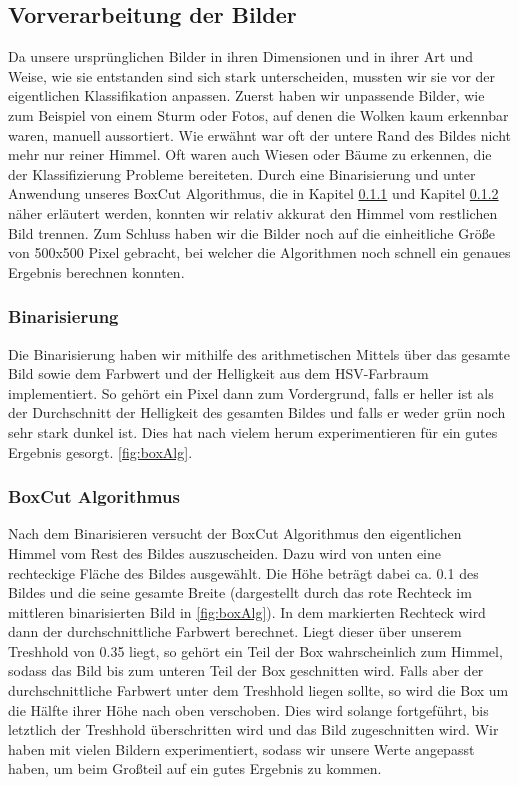 \documentclass[a4,german]{article}
\begin{document}
\subsection{Vorverarbeitung der Bilder}
\label{sec:vorverarbeitung}
Da unsere ursprünglichen Bilder in ihren Dimensionen und in ihrer Art und Weise, wie sie entstanden sind sich stark unterscheiden, mussten wir sie vor der eigentlichen Klassifikation anpassen.
Zuerst haben wir unpassende Bilder, wie zum Beispiel von einem Sturm oder Fotos, auf denen die Wolken kaum erkennbar waren, manuell aussortiert.
Wie erwähnt war oft der untere Rand des Bildes nicht mehr nur reiner Himmel. Oft waren auch Wiesen oder Bäume zu erkennen, die der Klassifizierung Probleme bereiteten.
Durch eine Binarisierung und unter Anwendung unseres BoxCut Algorithmus, die in Kapitel \ref{sec:binary} und Kapitel \ref{sec:boxcut} näher erläutert werden, konnten wir relativ akkurat den Himmel vom restlichen Bild trennen.
Zum Schluss haben wir die Bilder noch auf die einheitliche Größe von 500x500 Pixel gebracht, bei welcher die Algorithmen noch schnell ein genaues Ergebnis berechnen konnten.


\subsubsection{Binarisierung} 
\label{sec:binary}
Die Binarisierung haben wir mithilfe des arithmetischen Mittels über das gesamte Bild sowie dem Farbwert und der Helligkeit aus dem HSV-Farbraum implementiert.
So gehört  ein Pixel dann zum Vordergrund, falls er heller ist als der Durchschnitt der Helligkeit des gesamten Bildes und falls er weder grün noch sehr stark dunkel ist.
Dies hat nach vielem herum experimentieren für ein gutes Ergebnis gesorgt. \ref{fig:boxAlg}.

\subsubsection{BoxCut Algorithmus}
\label{sec:boxcut}
Nach dem Binarisieren versucht der BoxCut Algorithmus den eigentlichen Himmel vom Rest des Bildes auszuscheiden. Dazu wird von unten eine rechteckige Fläche des Bildes ausgewählt. Die Höhe beträgt dabei ca. 0.1 %
des Bildes und die seine gesamte Breite (dargestellt durch das rote Rechteck im mittleren binarisierten Bild in \ref{fig:boxAlg}). In dem markierten Rechteck wird dann der durchschnittliche Farbwert berechnet.
Liegt dieser über unserem Treshhold %
von 0.35 liegt, so gehört ein Teil der Box wahrscheinlich zum Himmel, sodass das Bild bis zum unteren Teil der Box geschnitten wird.
Falls aber der durchschnittliche Farbwert unter dem Treshhold liegen sollte, so wird die Box um die Hälfte ihrer Höhe nach oben verschoben. Dies wird solange fortgeführt, bis letztlich der Treshhold überschritten wird und das Bild zugeschnitten wird.
Wir haben mit vielen Bildern experimentiert, sodass wir unsere Werte angepasst haben, um beim Großteil auf ein gutes Ergebnis zu kommen.
\end{document}
